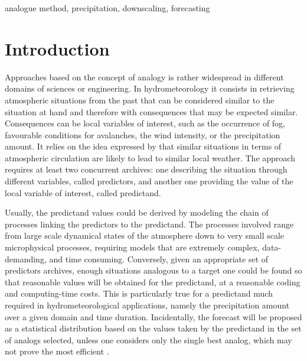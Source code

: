 \documentclass[review]{elsarticle}
\begin{document}
\begin{frontmatter}
\begin{abstract}
The Optimizer integrates the common semi-automatic sequential approach, as well as Monte\textendash Carlo analyses, and a global optimization technique by means of Genetic Algorithms. 

\end{abstract}

\begin{keyword}
analogue method, precipitation, downscaling, forecasting
\end{keyword}

\end{frontmatter}

\linenumbers


\section{Introduction}

Approaches based on the concept of analogy is rather widespread in different domains of sciences or engineering. In hydrometeorology it consists in retrieving atmospheric situations from the past that can be considered similar to the situation at hand and therefore with consequences that may be expected similar. Consequences can be local variables of interest, such as the occurrence of fog, favourable conditions for avalanches, the wind intensity, or the precipitation amount. It relies on the idea expressed by \citet{Lorenz1956, Lorenz1969} that similar situations in terms of atmospheric circulation are likely to lead to similar local weather. The approach requires at least two concurrent archives: one describing the situation through different variables, called predictors, and another one providing the value of the local variable of interest, called predictand.

Usually, the predictand values could be derived by modeling the chain of processes linking the predictors to the predictand. The processes involved range from large scale dynamical states of the atmosphere down to very small scale microphysical processes, requiring models that are extremely complex, data-demanding, and time consuming. Conversely, given an appropriate set of predictors archives, enough situations analogous to a target one could be found so that reasonable values will be obtained for the predictand, at a reasonable coding and computing-time costs. This is particularly true for a predictand much required in hydrometeorological applications, namely the precipitation amount over a given domain and time duration. Incidentally, the forecast will be proposed as a statistical distribution based on the values taken by the predictand in the set of analogs selected, unless one considers only the single best analog, which may not prove the most efficient \citep{Bontron2005}.
\end{document}
